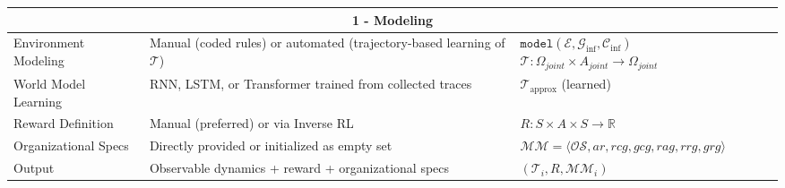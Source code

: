 \begin{table}[h!]
\begin{footnotesize}
\begin{tabular}{|p{2cm}|p{6cm}|p{3cm}|}
            \multicolumn{3}{|c|}{\textbf{1 - Modeling}}                                                                                                                                                                                                                                    \\ \hline
            Environment Modeling          & Manual (coded rules) or automated (trajectory-based learning of $\mathcal{T}$) & $\texttt{model}(\mathcal{E}, \mathcal{G}_{\text{inf}}, \mathcal{C}_{\text{inf}})$ \newline $\mathcal{T} : \Omega_{joint} \times A_{joint} \to \Omega_{joint}$ \\ \hline
            World Model Learning          & RNN, LSTM, or Transformer trained from collected traces                        & $\mathcal{T}_{\text{approx}}$ (learned)                                                                                                                       \\ \hline
            Reward Definition             & Manual (preferred) or via Inverse RL                                           & $R : S \times A \times S \to \mathbb{R}$                                                                                                                      \\ \hline
            Organizational Specs          & Directly provided or initialized as empty set                                  & $\mathcal{MM} = \langle \mathcal{OS}, \allowbreak ar, \allowbreak rcg, \allowbreak gcg, rag, \allowbreak rrg, \allowbreak grg \rangle$                        \\ \hline
            Output                        & Observable dynamics + reward + organizational specs                            & $(\mathcal{T}_i, R, \mathcal{MM}_i)$                                                                                                                          \\ \hline


\end{tabular}
\end{footnotesize}
\end{table}
